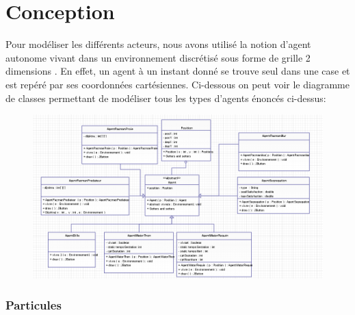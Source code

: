 \documentclass[a4paper,12pt]{report}
\begin{document}
\section*{Conception}
Pour modéliser les différents acteurs, nous avons utilisé la notion d'agent autonome vivant dans un environnement discrétisé sous forme de grille 2 dimensions . En effet, un agent à un instant donné se trouve seul dans une case et est repéré par ses coordonnées cartésiennes.
Ci-dessous on peut voir le diagramme de classes permettant de modéliser tous les types d'agents énoncés ci-dessus:\\
\begin{figure}[!ht]
	\center 
	\includegraphics[scale=0.5]{./agents.png}
\end{figure}
\subsubsection*{Particules}
\end{document}
